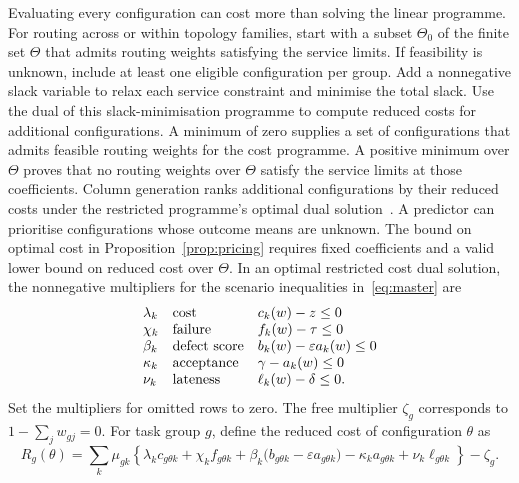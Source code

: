 \documentclass[11pt,reqno]{amsart}
\theoremstyle{definition}
\theoremstyle{remark}
\begin{document}
Evaluating every configuration can cost more than solving the linear programme.
For routing across or within topology families, start with a subset $\Theta_0$ of the finite set $\Theta$ that admits routing weights satisfying the service limits. If feasibility is unknown, include at least one eligible configuration per group. Add a nonnegative slack variable to relax each service constraint and minimise the total slack. Use the dual of this slack-minimisation programme to compute reduced costs for additional configurations. A minimum of zero supplies a set of configurations that admits feasible routing weights for the cost programme. A positive minimum over $\Theta$ proves that no routing weights over $\Theta$ satisfy the service limits at those coefficients.
Column generation ranks additional configurations by their reduced costs under the restricted programme's optimal dual solution~\cite{dantzigwolfe}.
A predictor can prioritise configurations whose outcome means are unknown. The bound on optimal cost in Proposition~\ref{prop:pricing} requires fixed coefficients and a valid lower bound on reduced cost over $\Theta$.
In an optimal restricted cost dual solution, the nonnegative multipliers for the scenario inequalities in~\eqref{eq:master} are
\[
 \begin{array}{@{}ll@{\quad}l@{}}
 \lambda_k & \text{cost}       & c_k(w)-z\le0 \\
 \chi_k    & \text{failure}    & f_k(w)-\tau\le0 \\
 \beta_k   & \text{defect score} & b_k(w)-\varepsilon a_k(w)\le0 \\
 \kappa_k  & \text{acceptance} & \gamma-a_k(w)\le0 \\
 \nu_k     & \text{lateness}   & \ell_k(w)-\delta\le0.
 \end{array}
\]
Set the multipliers for omitted rows to zero. The free multiplier $\zeta_g$ corresponds to $1-\sum_jw_{gj}=0$.
For task group $g$, define the reduced cost of configuration $\theta$ as
\begin{equation}
 R_g(\theta)=
 \sum_k\mu_{gk}
 \left\{
 \lambda_kc_{g\theta k}+\chi_k f_{g\theta k}
 +\beta_k\bigl(b_{g\theta k}-\varepsilon a_{g\theta k}\bigr)
 -\kappa_ka_{g\theta k}
 +\nu_k\ell_{g\theta k}
 \right\}-\zeta_g.
 \label{eq:reduced-cost}
\end{equation}
\end{document}

